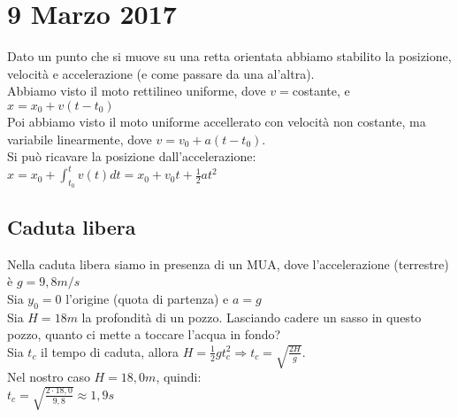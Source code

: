\documentclass{article}
\begin{document}
\section*{9 Marzo 2017}
Dato un punto che si muove su una retta orientata abbiamo stabilito la 
posizione, velocit\`{a} e accelerazione (e come passare da una al'altra).\\
Abbiamo visto il moto rettilineo uniforme, dove $v=$costante, e $x = x_0 + v(t-t_0)$\\
Poi abbiamo visto il moto uniforme accellerato con velocit\`{a} non costante, ma variabile linearmente, dove $v=v_0+a(t-t_0)$.\\
Si pu\`{o} ricavare la posizione dall'accelerazione:\\
$x=x_0+\int_{t_0}^t v(t)dt=x_0+v_0t+\frac{1}{2}at^2$\\
\subsection*{Caduta libera}
Nella caduta libera siamo in presenza di un MUA, dove l'accelerazione 
(terrestre) \`{e} $g=9,8m\slash s$\\
Sia $y_0=0$ l'origine (quota di partenza) e $a=g$\\
Sia $H=18m$ la profondit\`{a} di un pozzo. Lasciando cadere un sasso
in questo pozzo, quanto ci mette a toccare l'acqua in fondo?\\
Sia $t_c$ il tempo di caduta, allora $H=\frac{1}{2}gt_c^2\Rightarrow 
t_c=\sqrt{\frac{2H}{g}}$.\\
Nel nostro caso $H=18,0m$, quindi:\\
$t_c=\sqrt{\frac{2\cdot 18,0}{9,8}}\approx1,9 s$\\
\end{document}

